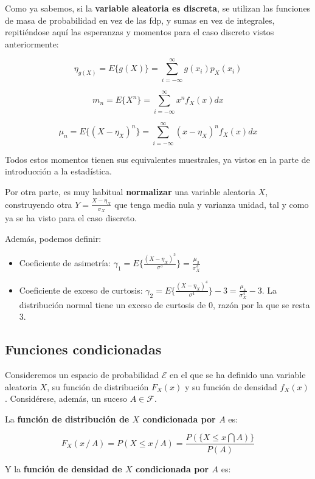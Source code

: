 \documentclass[11pt]{article}
\providecommand{\tightlist}{%
      \setlength{\itemsep}{0pt}\setlength{\parskip}{0pt}}
\begin{document}
Como ya sabemos, si la \textbf{variable aleatoria es discreta}, se
utilizan las funciones de masa de probabilidad en vez de las fdp, y
sumas en vez de integrales, repitiéndose aquí las esperanzas y momentos
para el caso discreto vistos anteriormente:

\[\eta_{g(X)} = E\{g(X)\}=\sum_{i=-\infty}^{\infty}g(x_i)p_X(x_i)\]

\[m_n=E\{X^n\}=\sum_{i=-\infty}^{\infty}x^nf_X(x)dx\]

\[\mu_n=E\{(X-\eta_X)^n\}=\sum_{i=-\infty}^{\infty}(x-\eta_X)^nf_X(x)dx\]

    Todos estos momentos tienen sus equivalentes muestrales, ya vistos en la
parte de introducción a la estadística.

Por otra parte, es muy habitual \textbf{normalizar} una variable
aleatoria \(X\), construyendo otra \(Y=\frac{X-\eta_X}{\sigma_X}\) que
tenga media nula y varianza unidad, tal y como ya se ha visto para el
caso discreto.

Además, podemos definir:

\begin{itemize}
\tightlist
\item
  Coeficiente de asimetría:
  \(\gamma_1=E\{\frac{(X-\eta_X)^3}{\sigma^3}\}=\frac{\mu_3}{\sigma_X^3}\)
\item
  Coeficiente de exceso de curtosis:
  \(\gamma_2=E\{\frac{(X-\eta_X)^4}{\sigma^4}\}-3=\frac{\mu_4}{\sigma_X^4}-3\).
  La distribución normal tiene un exceso de curtosis de 0, razón por la
  que se resta 3.
\end{itemize}

    \hypertarget{funciones-condicionadas}{%
\subsection*{Funciones condicionadas}\label{funciones-condicionadas}}

Consideremos un espacio de probabilidad \(\mathscr{E}\) en el que se ha
definido una variable aleatoria \(X\), su función de distribución
\(F_X(x)\) y su función de densidad \(f_X(x)\). Considérese, además, un
suceso \(A \in \mathscr{F}\).

La \textbf{función de distribución de \(X\) condicionada por \(A\)} es:

\[F_X(x\, /\, A) = P(X \leq x \, /\, A) = \frac{P(\{X \leq x \bigcap A )\} }{P(A)}\]

Y la \textbf{función de densidad de \(X\) condicionada por \(A\)} es:
\end{document}
